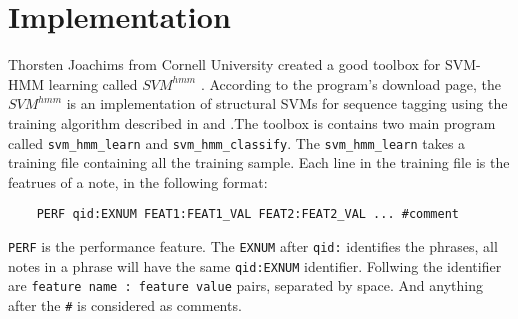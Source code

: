 





\section{Implementation}
Thorsten Joachims from Cornell University created a good toolbox for SVM-HMM learning called $SVM^{hmm}$ \cite{Joachims2008}. According to the program's download page, the $SVM^{hmm}$ is an implementation of structural SVMs for sequence tagging \cite{TODO:altun2003} using the training algorithm described in \cite{TODO:tsoch2004, 2005} and \cite{TODO:Joachims et al. 2009}.The toolbox is contains two main program called \texttt{svm\_hmm\_learn} and \texttt{svm\_hmm\_classify}. The \texttt{svm\_hmm\_learn} takes a training file containing all the training sample. Each line in the training file is the featrues of a note, in the following format:
\begin{lstlisting}
	PERF qid:EXNUM FEAT1:FEAT1_VAL FEAT2:FEAT2_VAL ... #comment
\end{lstlisting}
\texttt{PERF} is the performance feature. The \texttt{EXNUM} after \texttt{qid:} identifies the phrases, all notes in a phrase will have the same \texttt{qid:EXNUM} identifier. Follwing the identifier are \texttt{feature name : feature value} pairs, separated by space. And anything after the \texttt{\#} is considered as comments.


